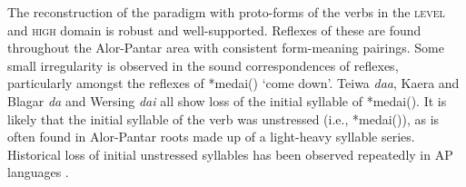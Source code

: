 The reconstruction of the paradigm with proto-forms of the verbs in the \textsc{level} and \textsc{high} domain is robust and well-supported. Reflexes of these are found throughout the Alor-Pantar area with consistent form-meaning pairings. Some small irregularity is observed in the sound correspondences of reflexes, particularly amongst the reflexes of *medai({\ng}) `come down'. Teiwa \textit{daa}, Kaera and Blagar \textit{da} and Wersing \textit{dai} all show loss of the initial syllable of *medai({\ng}). It is likely that the initial syllable of the verb was unstressed (i.e., *me{\textprimstress}dai({\ng})), as is often found in Alor-Pantar roots made up of a light-heavy syllable series. Historical loss of initial unstressed syllables has been observed repeatedly in AP languages \citep[93,111]{HoltonEtAl2012}.

 

